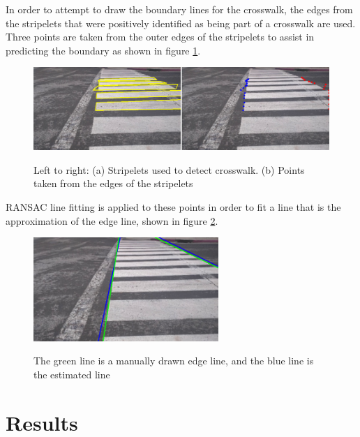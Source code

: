 \documentclass[12pt]{ucthesis}
\newcommand{\captionfonts}{\small\bf\ssp}
\begin{document}
In order to attempt to draw the boundary lines for the crosswalk, the edges from the stripelets that were positively identified as being part of a crosswalk are used. Three points are taken from the outer edges of the stripelets to assist in predicting the boundary as shown in figure \ref{fig:LinesAndEdgePoints}.  

\begin{figure}[ht]
\begin{center}
\includegraphics[width=14cm]{LinesAndEdgePoints.png}
\captionfonts
\caption[Crosswalk Detected Stripelets and points along their edges]{Left to right: (a) Stripelets used to detect crosswalk. (b) Points taken from the edges of the stripelets}
\label{fig:LinesAndEdgePoints}
\end{center}
\end{figure}

RANSAC line fitting is applied to these points in order to fit a line that is the approximation of the edge line, shown in figure \ref{fig:LinesUsingJustGoodStartAndEnds}. 

\begin{figure}[ht]
\begin{center}
\includegraphics[width=7cm]{LinesUsingJustGoodStartAndEnds.png}
\captionfonts
\caption[Manually Entered and Estimated Line]{The green line is a manually drawn edge line, and the blue line is the estimated line}
\label{fig:LinesUsingJustGoodStartAndEnds}
\end{center}
\end{figure}


\chapter{Results}
\label{results}
\end{document}
